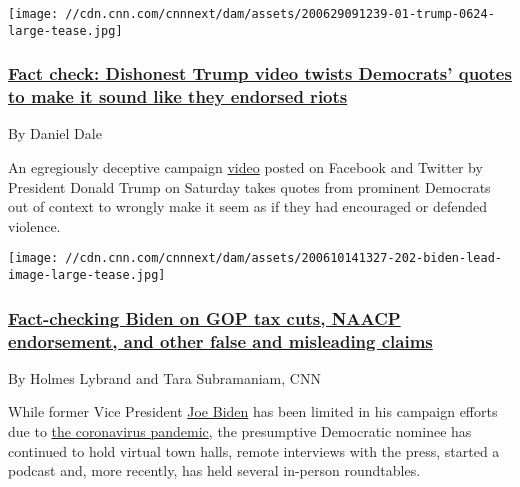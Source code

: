 \href{/2020/06/29/politics/fact-check-dishonest-trump-video-democrats/index.html}{}

\texttt{[image: //cdn.cnn.com/cnnnext/dam/assets/200629091239-01-trump-0624-large-tease.jpg]}

\hypertarget{fact-check-dishonest-trump-video-twists-democrats-quotes-to-make-it-sound-like-they-endorsed-riots}{%
\subsubsection{\texorpdfstring{\href{/2020/06/29/politics/fact-check-dishonest-trump-video-democrats/index.html}{Fact
check: Dishonest Trump video twists Democrats' quotes to make it sound
like they endorsed
riots}}{Fact check: Dishonest Trump video twists Democrats' quotes to make it sound like they endorsed riots}}\label{fact-check-dishonest-trump-video-twists-democrats-quotes-to-make-it-sound-like-they-endorsed-riots}}

By Daniel Dale

An egregiously deceptive campaign
\href{https://www.facebook.com/watch/?v=2918759308249818\%20and\%20Twitter\%20https://twitter.com/realDonaldTrump/status/1276995624588709888?s=20}{video}
posted on Facebook and Twitter by President Donald Trump on Saturday
takes quotes from prominent Democrats out of context to wrongly make it
seem as if they had encouraged or defended violence.

\href{/2020/06/27/politics/joe-biden-fact-check-gop-tax-cuts-naacp-endorsement/index.html}{}

\texttt{[image: //cdn.cnn.com/cnnnext/dam/assets/200610141327-202-biden-lead-image-large-tease.jpg]}

\hypertarget{fact-checking-biden-on-gop-tax-cuts-naacp-endorsement-and-other-false-and-misleading-claims}{%
\subsubsection{\texorpdfstring{\href{/2020/06/27/politics/joe-biden-fact-check-gop-tax-cuts-naacp-endorsement/index.html}{Fact-checking
Biden on GOP tax cuts, NAACP endorsement, and other false and misleading
claims}}{Fact-checking Biden on GOP tax cuts, NAACP endorsement, and other false and misleading claims}}\label{fact-checking-biden-on-gop-tax-cuts-naacp-endorsement-and-other-false-and-misleading-claims}}

By Holmes Lybrand and Tara Subramaniam, CNN

While former Vice President
\href{https://www.cnn.com/election/2020/candidate/biden}{Joe Biden} has
been limited in his campaign efforts due to
\href{https://www.cnn.com/interactive/2020/health/coronavirus-us-maps-and-cases/}{the
coronavirus pandemic}, the presumptive Democratic nominee has continued
to hold virtual town halls, remote interviews with the press, started a
podcast and, more recently, has held several in-person roundtables.

